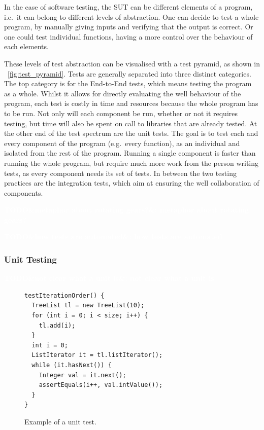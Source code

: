 \documentclass[11pt]{sdm_internship}
\newcommand{\todo}[1]{\colorbox{Red!75}{\textcolor{white}{\textbf{TODO\ifx&#1&\else: #1\fi}}}}
\theoremstyle{definition}
\begin{document}
In the case of software testing, the SUT can be different elements of a program, i.e.\ it can belong to different levels of abstraction.
One can decide to test a whole program, by manually giving inputs and verifying that the output is correct.
Or one could test individual functions, having a more control over the behaviour of each elements.

These levels of test abstraction can be visualised with a test pyramid, as shown in \figurename~\ref{fig:test_pyramid}.
Tests are generally separated into three distinct categories.
The top category is for the End-to-End tests, which means testing the program as a whole.
Whilst it allows for directly evaluating the well behaviour of the program, each test is costly in time and resources because the whole program has to be run.
Not only will each component be run, whether or not it requires testing, but time will also be spent on call to libraries that are already tested.
At the other end of the test spectrum are the unit tests.
The goal is to test each and every component of the program (e.g.\ every function), as an individual and isolated from the rest of the program.
Running a single component is faster than running the whole program, but require much more work from the person writing tests, as every component needs its set of tests.
In between the two testing practices are the integration tests, which aim at ensuring the well collaboration of components.

\todo{metaphor about rotating gears?}

\todo{how tests are automated}

\subsubsection{Unit Testing}%
\label{sssec:unit_testing}

\todo{not clear what a unit is\cite{runeson2006survey}}
\begin{figure}
  \centering
  \begin{verbatim}
testIterationOrder() {
  TreeList tl = new TreeList(10);
  for (int i = 0; i < size; i++) {
    tl.add(i);
  }
  int i = 0;
  ListIterator it = tl.listIterator();
  while (it.hasNext()) {
    Integer val = it.next();
    assertEquals(i++, val.intValue());
  }
}
  \end{verbatim}
  \caption{Example of a unit test.}%
\label{fig:test_example}
\end{figure}
\end{document}
